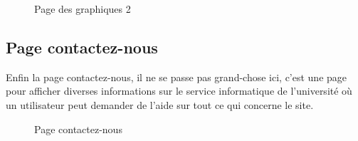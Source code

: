 \documentclass[12pt]{report}
\begin{document}
\begin{figure}[H]
\centering
\caption{Page des graphiques 2}
  \vspace*{-0.1in}
\end{figure}

\newpage

\subsection{Page contactez-nous}

Enfin la page contactez-nous, il ne se passe pas grand-chose ici, c'est une page pour afficher diverses informations sur le service informatique de l'université où un utilisateur peut demander de l'aide sur tout ce qui concerne le site.

\vspace{0.2in}

\begin{figure}[h]
\centering
\caption{Page contactez-nous}
\end{figure}
\end{document}
